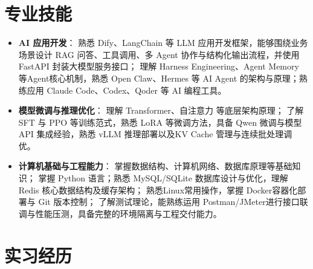 \documentclass[10pt]{article}
\newlength{\iconwidth}
\begin{document}

    \section[专业技能]{\makebox[\iconwidth][c]{\color{primarycolor}{\faWrench}}\quad 专业技能}
    \begin{itemize}
        \item \textbf{AI 应用开发}：
        熟悉 Dify、LangChain 等 LLM 应用开发框架，能够围绕业务场景设计 RAG 问答、工具调用、多 Agent 协作与结构化输出流程，并使用 FastAPI 封装大模型服务接口；
        理解 Harness Engineering、Agent Memory 等Agent核心机制，熟悉 Open Claw、Hermes 等 AI Agent 的架构与原理；熟练应用 Claude Code、Codex、Qoder 等 AI 编程工具。
        \item \textbf{模型微调与推理优化}：
        理解 Transformer、自注意力 等底层架构原理；
        了解 SFT 与 PPO 等训练范式，熟悉 LoRA 等微调方法，具备 Qwen 微调与模型 API 集成经验，熟悉 vLLM 推理部署以及KV Cache 管理与连续批处理调优。
        \item \textbf{计算机基础与工程能力}：
        掌握数据结构、计算机网络、数据库原理等基础知识；
        掌握 Python 语言；熟悉 MySQL/SQLite 数据库设计与优化，理解 Redis 核心数据结构及缓存架构；
        熟悉Linux常用操作，掌握 Docker容器化部署与 Git 版本控制；
        了解测试理论，能熟练运用 Postman/JMeter进行接口联调与性能压测，具备完整的环境隔离与工程交付能力。
    \end{itemize}



    \section[实习经历]{\makebox[\iconwidth][c]{\color{primarycolor}{\faBriefcase}}\quad 实习经历}
\end{document}
